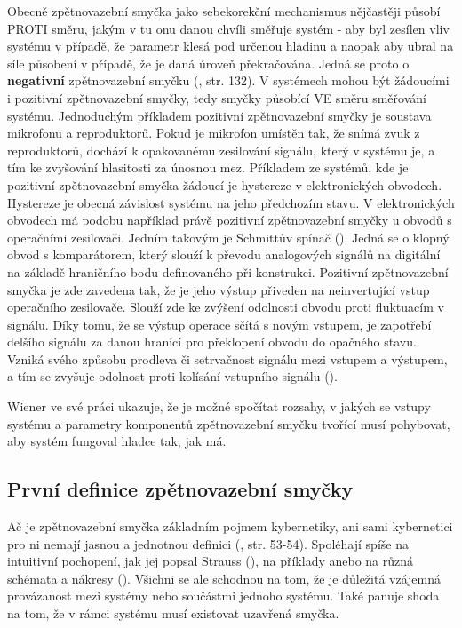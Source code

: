 \documentclass[11pt,a4paper]{article}
\begin{document}
Obecně zpětnovazební smyčka jako sebekorekční mechanismus nějčastěji působí PROTI směru, jakým v tu onu danou chvíli směřuje systém - aby byl zesílen vliv systému v případě, že parametr klesá pod určenou hladinu a naopak aby ubral na síle působení v případě, že je daná úroveň překračována. Jedná se proto o \textbf{negativní} zpětnovazební smyčku (\cite{wiener_cybernetics_2019}, str. 132). V systémech mohou být žádoucími i pozitivní zpětnovazební smyčky, tedy smyčky působící VE směru směřování systému. Jednoduchým příkladem pozitivní zpětnovazební smyčky je soustava mikrofonu a reproduktorů. Pokud je mikrofon umístěn tak, že snímá zvuk z reproduktorů, dochází k opakovanému zesilování signálu, který v systému je, a tím ke zvyšování hlasitosti za únosnou mez. Příkladem ze systémů, kde je pozitivní zpětnovazební smyčka žádoucí je hystereze v elektronických obvodech. Hystereze je obecná závislost systému na jeho předchozím stavu. V elektronických obvodech má podobu například právě pozitivní zpětnovazební smyčky u obvodů s operačními zesilovači. Jedním takovým je Schmittův spínač (\cite{schmitt_thermionic_1938}). Jedná se o klopný obvod s komparátorem, který slouží k převodu analogových signálů na digitální na základě hraničního bodu definovaného při konstrukci. Pozitivní zpětnovazební smyčka je zde zavedena tak, že je jeho výstup přiveden na neinvertující vstup operačního zesilovače. Slouží zde ke zvýšení odolnosti obvodu proti fluktuacím v signálu. Díky tomu, že se výstup operace sčítá s novým vstupem, je zapotřebí delšího signálu za danou hranicí pro překlopení obvodu do opačného stavu. Vzniká svého způsobu prodleva či setrvačnost signálu mezi vstupem a výstupem, a tím se zvyšuje odolnost proti kolísání vstupního signálu (\cite{otypka_schmittuv_nodate}).

Wiener ve své práci ukazuje, že je možné spočítat rozsahy, v jakých se vstupy systému a parametry komponentů zpětnovazební smyčku tvořící musí pohybovat, aby systém fungoval hladce tak, jak má. 

\subsection{První definice zpětnovazební smyčky}

Ač je zpětnovazební smyčka základním pojmem kybernetiky, ani sami kybernetici pro ni nemají jasnou a jednotnou definici (\cite{wiener_cybernetics_2019, ashby_introduction_2015}, str. 53-54). Spoléhají spíše na intuitivní pochopení, jak jej popsal Strauss (\cite*{strauss_scope_2002}), na příklady anebo na různá schémata a nákresy (\cite{wiener_cybernetics_2019, ashby_introduction_2015, albertos_perez_feedback_2010, astrom_feedback_2021}). Všichni se ale schodnou na tom, že je důležitá vzájemná provázanost mezi systémy nebo součástmi jednoho systému. Také panuje shoda na tom, že v rámci systému musí existovat uzavřená smyčka. 
\end{document}
